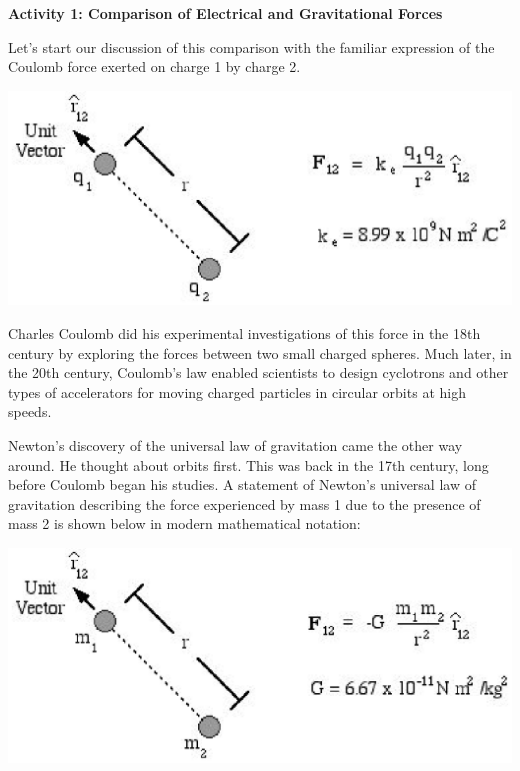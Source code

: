 \textbf{Activity 1: Comparison of Electrical and Gravitational Forces }

Let's start our discussion of this comparison with the familiar expression of
the Coulomb force exerted on charge 1 by charge 2. 

\vspace{0.3cm}
{\par\centering \includegraphics{elec_grav_fig3.eps} \par}
\vspace{0.3cm}

Charles Coulomb did his experimental investigations of this force in the 18th
century by exploring the forces between two small charged spheres. Much later,
in the 20th century, Coulomb's law enabled scientists to design cyclotrons and
other types of accelerators for moving charged particles in circular orbits
at high speeds. 

Newton's discovery of the universal law of gravitation came the other way around.
He thought about orbits first. This was back in the 17th century, long before
Coulomb began his studies. A statement of Newton's universal law of gravitation
describing the force experienced by mass 1 due to the presence of mass 2 is
shown below in modern mathematical notation: 

\vspace{0.3cm}
{\par\centering \includegraphics{elec_grav_fig4.eps} \par}
\vspace{0.3cm}


